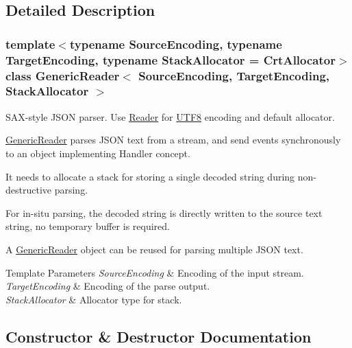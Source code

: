 \subsection{Detailed Description}
\subsubsection*{template$<$typename Source\+Encoding, typename Target\+Encoding, typename Stack\+Allocator = Crt\+Allocator$>$\newline
class Generic\+Reader$<$ Source\+Encoding, Target\+Encoding, Stack\+Allocator $>$}

S\+A\+X-\/style J\+S\+ON parser. Use \hyperlink{a00563_a84f3b66a66647f4ac4267078359188ba}{Reader} for \hyperlink{a02144}{U\+T\+F8} encoding and default allocator. 

\hyperlink{a02220}{Generic\+Reader} parses J\+S\+ON text from a stream, and send events synchronously to an object implementing Handler concept.

It needs to allocate a stack for storing a single decoded string during non-\/destructive parsing.

For in-\/situ parsing, the decoded string is directly written to the source text string, no temporary buffer is required.

A \hyperlink{a02220}{Generic\+Reader} object can be reused for parsing multiple J\+S\+ON text.


\begin{DoxyTemplParams}{Template Parameters}
{\em Source\+Encoding} & Encoding of the input stream. \\
\hline
{\em Target\+Encoding} & Encoding of the parse output. \\
\hline
{\em Stack\+Allocator} & Allocator type for stack. \\
\hline
\end{DoxyTemplParams}


\subsection{Constructor \& Destructor Documentation}
\mbox{\label{a02220_aab875a34b3092df9fb4e2b8eac6dbb96}} 
